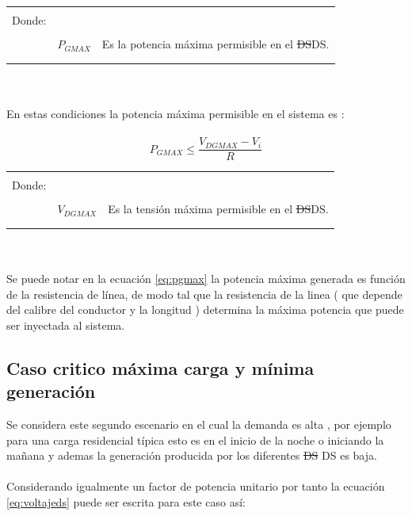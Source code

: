 \documentclass[12pt, letterpaper]{report}
\providecommand{\DIFdeltex}[1]{{\protect\color{red}\sout{#1}}}                      %
\providecommand{\DIFaddbegin}{} %
\providecommand{\DIFaddend}{} %
\providecommand{\DIFdelbegin}{} %
\providecommand{\DIFdelend}{} %
\providecommand{\DIFdel}[1]{\texorpdfstring{\DIFdeltex{#1}}{}} %
\begin{document}
\begin{tabular}{l c r}
    & &\\
    Donde:& & \\
    & &\\
    & $P_{GMAX}$ & Es la potencia máxima permisible en el \DIFdelbegin \DIFdel{DS}\DIFdelend \DIFaddbegin \ac{DS}\DIFaddend .\\
    & &\\
    & &\\
\end{tabular}\\\\
En estas condiciones la potencia máxima permisible en el sistema es :\\\\
\begin{equation}
P_{GMAX} \leq \frac{V_{DGMAX} - V_{i}}{R}
\label{eq:pgmax}
\end{equation}
\begin{tabular}{l c r}
    & &\\
    Donde:& & \\
    & &\\
    & $V_{DGMAX}$ & Es la tensión máxima permisible en el \DIFdelbegin \DIFdel{DS}\DIFdelend \DIFaddbegin \ac{DS}\DIFaddend .\\
    & &\\
    & &\\
\end{tabular}\\\\
Se puede notar en la ecuación \ref{eq:pgmax} la potencia máxima generada es función de la resistencia de línea, de modo tal que la resistencia de la linea ( que depende del calibre del conductor y la longitud ) determina la máxima potencia que puede ser inyectada al sistema.\\
\subsection{Caso critico máxima carga y mínima generación }
Se considera este segundo escenario en el cual la demanda es alta , por ejemplo  para una carga residencial típica  esto es  en el inicio de la noche o iniciando la mañana y ademas la generación producida por los diferentes \DIFdelbegin \DIFdel{DS }\DIFdelend \DIFaddbegin \ac{DS} \DIFaddend es baja.\\\\
Considerando igualmente un factor de potencia unitario por tanto la ecuación \ref{eq:voltajeds} puede ser  escrita para este caso así:
\end{document}

